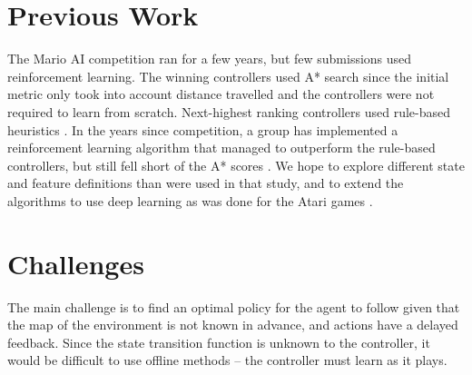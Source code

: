 \documentclass[12pt]{article}
\begin{document}
\section{Previous Work}

The Mario AI competition ran for a few years, but few submissions used reinforcement learning. The winning controllers used A* search since the initial metric only took into account distance travelled and the controllers were not required to learn from scratch. Next-highest ranking controllers used rule-based heuristics \cite{karakovskiy}. In the years since competition, a group has implemented a reinforcement learning algorithm that managed to outperform the rule-based controllers, but still fell short of the A* scores \cite{tsay}. We hope to explore different state and feature definitions than were used in that study, and to extend the algorithms to use deep learning as was done for the Atari games \cite{mnih}.



\section{Challenges}

The main challenge is to find an optimal policy for the agent to follow given that the map of the environment is not known in advance, and actions have a delayed feedback. Since the state transition function is unknown to the controller, it would be difficult to use offline methods -- the controller must learn as it plays. 
\end{document}
